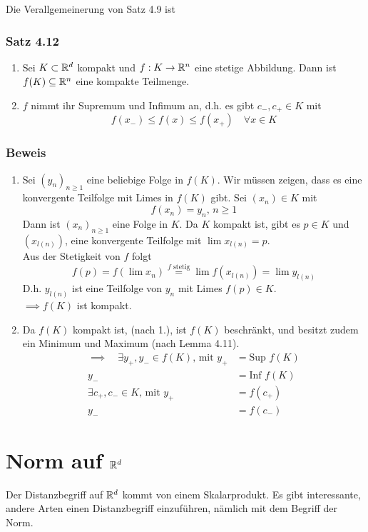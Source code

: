 \noindent Die Verallgemeinerung von Satz 4.9 ist

\subsubsection*{Satz 4.12}
\begin{enumerate}
\item Sei $K\subset \mathbb{R}^{d}$ kompakt und $f:K\to\mathbb{R}^{n}$ eine stetige Abbildung. Dann ist $f(K)\subseteq\mathbb{R}^{n}$ eine kompakte Teilmenge.
\item $f$ nimmt ihr Supremum und Infimum an, d.h. es gibt $c_{-}, c_{+}\in K$ mit \[ f(x_{-})\leq f(x) \leq f(x_{+}) \quad \forall x \in K\]
\end{enumerate}

\subsubsection*{Beweis}
\begin{enumerate}
\item Sei $(y_{n})_{n\geq 1}$ eine beliebige Folge in $f(K)$. Wir müssen zeigen, dass es eine konvergente Teilfolge mit Limes in $f(K)$ gibt. Sei $(x_{n}) \in K$ mit \[ f(x_{n}) = y_{n},\, n\geq 1\]
Dann ist $(x_{n})_{n\geq 1}$ eine Folge in $K$. Da $K$ kompakt ist, gibt es $p \in K$ und $(x_{l(n)})$, eine konvergente Teilfolge mit $\lim{x_{l(n)}} =p$. \\
Aus der Stetigkeit von $f$ folgt \[ f(p) = f(\lim{x_{n}}) \overset{f\text{ stetig}}= \lim{f(x_{l(n)})} = \lim{y_{l(n)}}\]
D.h. $y_{l(n)}$ ist eine Teilfolge von $y_{n}$ mit Limes $f(p) \in K$. \\
$\implies f(K)$ ist kompakt.
\item Da $f(K)$ kompakt ist, (nach 1.), ist $f(K)$ beschränkt, und besitzt zudem ein Minimum und Maximum (nach Lemma 4.11). \\
\begin{align*}\implies \quad \exists y_{+}, y_{-}\in f(K)\text{, mit } y_{+} &= \text{Sup } f(K) \\ y_{-} &= \text{Inf } f(K) \\
\exists c_{+}, c_{-} \in K \text{, mit } y_{+} &= f(c_{+}) \\ y_{-} &= f(c_{-}) \end{align*}
\end{enumerate}

\section{Norm auf $\mathbb{R}^{d}$}
Der Distanzbegriff auf $\mathbb{R}^{d}$ kommt von einem Skalarprodukt. Es gibt interessante, andere Arten einen Distanzbegriff einzuführen, nämlich mit dem Begriff der Norm.

